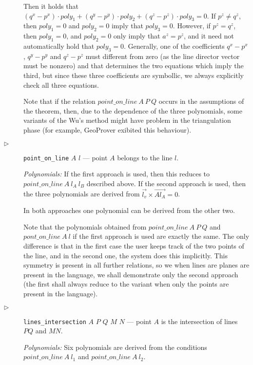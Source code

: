 \documentclass[final,1p,times,authoryear]{elsarticle}
\begin{document}
\begin{description}
Then it holds that
$(q^x - p^x) \cdot poly_1 + (q^y - p^y) \cdot poly_2 + (q^z - p^z)
\cdot poly_3 = 0$.
If $p^z \neq q^z$, then $poly_1 = 0$ and $poly_2 = 0$ imply that
$poly_3 = 0$. However, if $p^z = q^z$, then $poly_1 = 0$, and
$poly_2 = 0$ only imply that $a^z = p^z$, and it need not
automatically hold that $poly_3 = 0$. Generally, one of the
coefficients $q^x - p^x$, $q^y - p^y$ and $q^z - p^z$ must different
from zero (as the line director vector must be nonzero) and that
determines the two equations which imply the third, but since these
three coefficients are symbollic, we always explicitly check all three
equations. 

Note that if the relation $point\_on\_line\ A\ P\ Q$ occurs in the
assumptions of the theorem, then, due to the dependence of the three
polynomials, some variants of the Wu's method might have problem in
the triangulation phase (for example, GeoProver exibited this
behaviour).

\item[$\triangleright$] {\tt point\_on\_line} $A$ $l$ --- point $A$ belongs
  to the line $l$.

{\em Polynomials:} If the first approach is used, then this reduces to
$point\_on\_line\ A\ l_A\ l_B$ described above. If the second approach is
used, then the three polynomials are derived from
$\overrightarrow{l_v} \times \overrightarrow{Al_A} = 0$.

In both approaches one polynomial can be derived from the other two.

\bigskip 

Note that the polynomials obtained from $point\_on\_line\ A\ P\ Q$ and
$pont\_on\_line\ A\ l$ if the first approach is used are exactly the same.
The only difference is that in the first case the user keeps track of
the two points of the line, and in the second one, the system does
this implicitly. This symmetry is present in all further relations, so
we when lines are planes are present in the language, we shall
demonstrate only the second approach (the first shall always reduce to
the variant when only the points are present in the language).


\item[$\triangleright$] {\tt lines\_intersection} $A$ $P$ $Q$ $M$ $N$
  --- point $A$ is the intersection of lines $PQ$ and $MN$.

{\em Polynomials:} Six polynomials are derived from the conditions
$point\_on\_line\ A\ l_1$ and $point\_on\_line\ A\ l_2$.


\end{description}
\end{document}
